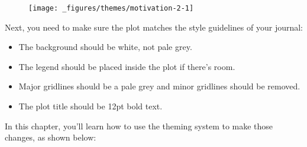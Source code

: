 \begin{figure}[H]
  \centering
  \texttt{[image: \_figures/themes/motivation-2-1]}
\end{figure}

Next, you need to make sure the plot matches the style guidelines of
your journal:

\begin{itemize}
\tightlist
\item
  The background should be white, not pale grey.
\item
  The legend should be placed inside the plot if there's room.
\item
  Major gridlines should be a pale grey and minor gridlines should be
  removed.
\item
  The plot title should be 12pt bold text.
\end{itemize}

In this chapter, you'll learn how to use the theming system to make
those changes, as shown below:

\begin{Shaded}
\begin{Highlighting}[]
\StringTok{ }
\StringTok{  }\NormalTok{() +}\StringTok{ }
\StringTok{  }\NormalTok{(}
     \NormalTok{(} \NormalTok{, } \NormalTok{),}
     \NormalTok{(} \NormalTok{, } \NormalTok{, } \NormalTok{),}
     \NormalTok{(}\NormalTok{, }\NormalTok{),}
     \NormalTok{(}\NormalTok{, }\NormalTok{),}
     \NormalTok{(} \NormalTok{, } \NormalTok{),}
     \NormalTok{(} \NormalTok{, } \NormalTok{),}
     \NormalTok{()}
  \NormalTok{)}
\end{Highlighting}
\end{Shaded}


